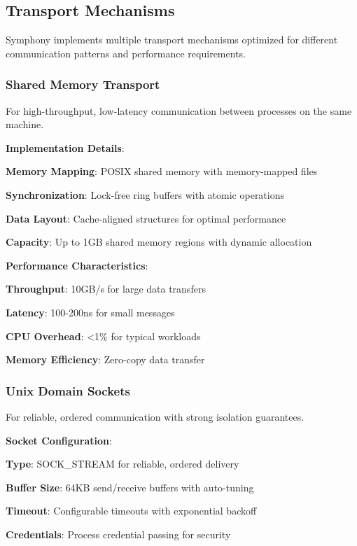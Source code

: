 \subsection*{Transport Mechanisms}

Symphony implements multiple transport mechanisms optimized for different communication patterns and performance requirements.

\subsubsection*{Shared Memory Transport}

For high-throughput, low-latency communication between processes on the same machine.

\textbf{Implementation Details}:
\begin{compactlist}
    \item \textbf{Memory Mapping}: POSIX shared memory with memory-mapped files
    \item \textbf{Synchronization}: Lock-free ring buffers with atomic operations
    \item \textbf{Data Layout}: Cache-aligned structures for optimal performance
    \item \textbf{Capacity}: Up to 1GB shared memory regions with dynamic allocation
\end{compactlist}

\textbf{Performance Characteristics}:
\begin{compactlist}
    \item \textbf{Throughput}: 10GB/s for large data transfers
    \item \textbf{Latency}: 100-200ns for small messages
    \item \textbf{CPU Overhead}: <1\% for typical workloads
    \item \textbf{Memory Efficiency}: Zero-copy data transfer
\end{compactlist}

\subsubsection*{Unix Domain Sockets}

For reliable, ordered communication with strong isolation guarantees.

\textbf{Socket Configuration}:
\begin{compactlist}
    \item \textbf{Type}: SOCK\_STREAM for reliable, ordered delivery
    \item \textbf{Buffer Size}: 64KB send/receive buffers with auto-tuning
    \item \textbf{Timeout}: Configurable timeouts with exponential backoff
    \item \textbf{Credentials}: Process credential passing for security
\end{compactlist}

